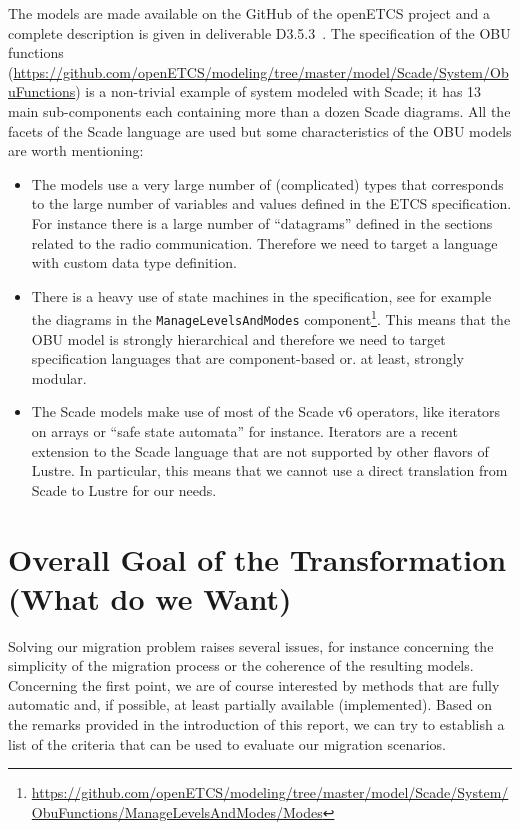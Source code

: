 \documentclass{template/openetcs_report}
\begin{document}
The models are made available on the GitHub of the openETCS project
and a complete description is given in deliverable D3.5.3~\cite{d353}.
The specification of the OBU functions
(\url{https://github.com/openETCS/modeling/tree/master/model/Scade/System/ObuFunctions})
is a non-trivial example of system modeled with Scade; it has 13 main
sub-components each containing more than a dozen Scade diagrams. All
the facets of the Scade language are used but some characteristics of
the OBU models are worth mentioning:
\begin{itemize}
\item The models use a very large number of (complicated) types that
  corresponds to the large number of variables and values defined in
  the ETCS specification. For instance there is a large number of
  ``datagrams'' defined in the sections related to the radio
  communication. Therefore we need to target a language with custom
  data type definition.

\item There is a heavy use of state machines in the specification, see
  for example the diagrams in the {\verb+ManageLevelsAndModes+}
  component\footnote{\url{https://github.com/openETCS/modeling/tree/master/model/Scade/System/ObuFunctions/ManageLevelsAndModes/Modes}}. This
  means that the OBU model is strongly hierarchical and therefore we
  need to target specification languages that are component-based
  or. at least, strongly modular.

\item The Scade models make use of most of the Scade v6 operators,
  like iterators on arrays or ``safe state automata'' for
  instance. Iterators are a recent extension to the Scade language
  that are not supported by other flavors of Lustre. In particular,
  this means that we cannot use a direct translation from Scade to
  Lustre for our needs.
\end{itemize}

\chapter{Overall Goal of the Transformation (What do we Want)}
\label{cha:over-goal-transf}


Solving our migration problem raises several issues, for instance
concerning the simplicity of the migration process or the coherence of
the resulting models. Concerning the first point, we are of course
interested by methods that are fully automatic and, if possible, at
least partially available (implemented). Based on the remarks provided
in the introduction of this report, we can try to establish a list of
the criteria that can be used to evaluate our migration scenarios.
\end{document}

